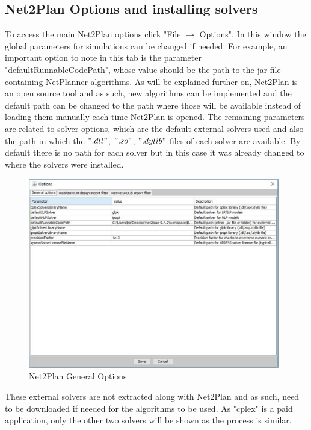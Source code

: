 	\subsection{Net2Plan Options and installing solvers}
	\vspace{0.5cm}
	To access the main Net2Plan options click "File $\rightarrow$ Options". In this window the global parameters for simulations can be changed if needed.
	For example, an important option to note in this tab is the parameter "defaultRunnableCodePath", whose value should be the path to the jar file containing NetPlanner algorithms. As will be explained further on, Net2Plan is an open source tool and as such, new algorithms can be implemented and the default path can be changed to the path where those will be available instead of loading them manually each time Net2Plan is opened.	The remaining parameters are related to solver options, which are the default external solvers used and also the path in which the $".dll"$, $".so"$, $".dylib"$ files of each solver are available. By default there is no path for each solver but in this case it was already changed to where the solvers were installed.
	\pagebreak
	
	\begin{figure}[h!]
		\centering
		\includegraphics[width = 11cm]{Net2Plan_options.pdf}
		\caption{Net2Plan General Options}
	\end{figure}
		
	
			
	These external solvers are not extracted along with Net2Plan and as such, need to be downloaded if needed for the algorithms to be used. As "cplex" is a paid application, only the other two solvers will be shown as the process is similar.\\
		
